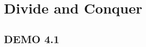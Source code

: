 \documentclass{article}
\theoremstyle{definition}
\theoremstyle{remark}
\begin{document}
\section{Divide and Conquer}
\subsection*{DEMO 4.1}




    
\end{document}
